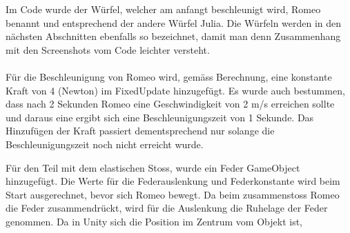 \documentclass[../main.tex]{subfiles}
\begin{document}
Im Code wurde der Würfel, welcher am anfangt beschleunigt wird, Romeo benannt und entsprechend der andere Würfel Julia. Die Würfeln werden in den nächsten Abschnitten ebenfalls so bezeichnet, damit man denn Zusammenhang mit den Screenshots vom Code leichter versteht. 
\\
\\
Für die Beschleunigung von Romeo wird, gemäss Berechnung, eine konstante Kraft von 4 (Newton) im FixedUpdate hinzugefügt. Es wurde auch bestummen, dass nach 2 Sekunden Romeo eine Geschwindigkeit von 2 m/s erreichen sollte und daraus eine ergibt sich eine Beschleunigungszeit von 1 Sekunde. Das Hinzufügen der Kraft passiert dementsprechend nur solange die Beschleunigungszeit noch nicht erreicht wurde.

Für den Teil mit dem elastischen Stoss, wurde ein Feder GameObject hinzugefügt. Die Werte für die Federauslenkung und Federkonstante wird beim Start ausgerechnet, bevor sich Romeo bewegt. Da beim zusammenstoss Romeo die Feder zusammendrückt, wird für die Auslenkung die Ruhelage der Feder genommen. Da in Unity sich die Position im Zentrum vom Objekt ist, 
\end{document}
